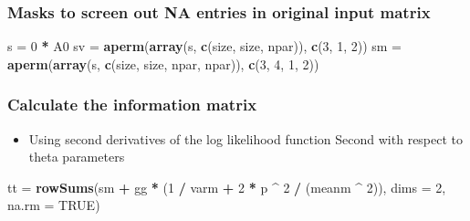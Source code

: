 \documentclass[]{article}
\newenvironment{Shaded}{\begin{snugshade}}{\end{snugshade}}
\newcommand{\DataTypeTok}[1]{\textcolor[rgb]{0.13,0.29,0.53}{#1}}
\newcommand{\DecValTok}[1]{\textcolor[rgb]{0.00,0.00,0.81}{#1}}
\newcommand{\KeywordTok}[1]{\textcolor[rgb]{0.13,0.29,0.53}{\textbf{#1}}}
\newcommand{\NormalTok}[1]{#1}
\newcommand{\OperatorTok}[1]{\textcolor[rgb]{0.81,0.36,0.00}{\textbf{#1}}}
\newcommand{\OtherTok}[1]{\textcolor[rgb]{0.56,0.35,0.01}{#1}}
\newcommand{\StringTok}[1]{\textcolor[rgb]{0.31,0.60,0.02}{#1}}
\providecommand{\tightlist}{%
  \setlength{\itemsep}{0pt}\setlength{\parskip}{0pt}}
\begin{document}
\hypertarget{masks-to-screen-out-na-entries-in-original-input-matrix}{%
\subsubsection{Masks to screen out NA entries in original input
matrix}\label{masks-to-screen-out-na-entries-in-original-input-matrix}}

\begin{Shaded}
\begin{Highlighting}[]
\NormalTok{s =}\StringTok{ }\DecValTok{0} \OperatorTok{*}\StringTok{ }\NormalTok{A0}
\NormalTok{sv =}\StringTok{ }\KeywordTok{aperm}\NormalTok{(}\KeywordTok{array}\NormalTok{(s, }\KeywordTok{c}\NormalTok{(size, size, npar)), }\KeywordTok{c}\NormalTok{(}\DecValTok{3}\NormalTok{, }\DecValTok{1}\NormalTok{, }\DecValTok{2}\NormalTok{))}
\NormalTok{sm =}\StringTok{ }\KeywordTok{aperm}\NormalTok{(}\KeywordTok{array}\NormalTok{(s, }\KeywordTok{c}\NormalTok{(size, size, npar, npar)), }\KeywordTok{c}\NormalTok{(}\DecValTok{3}\NormalTok{, }\DecValTok{4}\NormalTok{, }\DecValTok{1}\NormalTok{, }\DecValTok{2}\NormalTok{))}
\end{Highlighting}
\end{Shaded}

\hypertarget{calculate-the-information-matrix}{%
\subsubsection{Calculate the information
matrix}\label{calculate-the-information-matrix}}

\begin{itemize}
\tightlist
\item
  Using second derivatives of the log likelihood function Second with
  respect to theta parameters
\end{itemize}

\begin{Shaded}
\begin{Highlighting}[]
\NormalTok{tt =}\StringTok{ }\KeywordTok{rowSums}\NormalTok{(sm }\OperatorTok{+}\StringTok{ }\NormalTok{gg }\OperatorTok{*}\StringTok{ }\NormalTok{(}\DecValTok{1} \OperatorTok{/}\StringTok{ }\NormalTok{varm }\OperatorTok{+}\StringTok{ }\DecValTok{2} \OperatorTok{*}\StringTok{ }\NormalTok{p }\OperatorTok{^}\StringTok{ }\DecValTok{2} \OperatorTok{/}\StringTok{ }\NormalTok{(meanm }\OperatorTok{^}\StringTok{ }\DecValTok{2}\NormalTok{)), }\DataTypeTok{dims =} \DecValTok{2}\NormalTok{, }\DataTypeTok{na.rm =} \OtherTok{TRUE}\NormalTok{)}
\end{Highlighting}
\end{Shaded}
\end{document}
